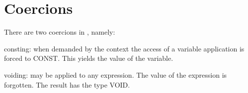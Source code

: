 \documentclass [a4paper,12pt,fleqn]{article}
\begin{document}
\section{Coercions}
There are two coercions in \ELANns, namely:
\begin{ciphlist}
\item
consting: when demanded by the context the access of a variable
application is forced to CONST. This yields the value of the variable.
\item
voiding: may be applied to any expression. The value of the expression
is forgotten. The result has the type VOID.
\end{ciphlist}
\end{document}

